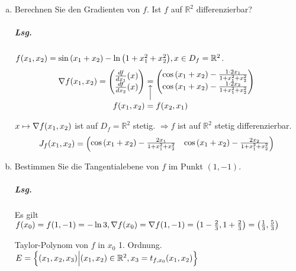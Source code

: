\documentclass{scrreprt}
\newcommand\skalprod[1]{\left\langle #1 \right\rangle}
\begin{document}
\newpage
\begin{enumerate}[a)]
\item Berechnen Sie den Gradienten von $f$.
  Ist $f$ auf $\mathbb{R}^2$ differenzierbar?

  \subparagraph{Lsg.}
  $f\qty(x_1, x_2) = \sin\qty(x_1 + x_2) - \ln\qty(1 + x_1^2 + x_2^2), x \in D_f = \mathbb{R}^2$.
  \[
    \nabla f\qty(x_1, x_2) = \begin{pmatrix}
      \frac{df}{dx_1}(x) \\
      \frac{df}{dx_2}(x)
    \end{pmatrix}
    \underset{\makebox[0pt]{$f\qty(x_1, x_2) = f\qty(x_2, x_1)$}}{\underset{\Big \uparrow}{=}}
    \begin{pmatrix}
      \cos\qty(x_1 + x_2) - \frac{1 \cdot 2 x_1}{1 + x_1^2 + x_2^2} \\
      \cos\qty(x_1 + x_2) - \frac{1 \cdot 2 x_2}{1 + x_1^2 + x_2^2}
    \end{pmatrix}
  \]

  $x \mapsto \nabla f\qty(x_1, x_2)$ ist auf $D_f = \mathbb{R}^2$ stetig.
  $\Rightarrow f$ ist auf $\mathbb{R}^2$ stetig differenzierbar.
  \[
    J_f\qty(x_1, x_2) = \begin{pmatrix}
      \cos\qty(x_1 + x_2) - \frac{2 x_1}{1 + x_1^2 + x_2^2} &
      \cos\qty(x_1 + x_2) - \frac{2 x_2}{1 + x_1^2 + x_2^2}
    \end{pmatrix}
  \]

\item Bestimmen Sie die Tangentialebene von $f$ im Punkt $(1, -1)$.
  \subparagraph{Lsg.}
  Es gilt $f\qty(x_0) = f(1, -1) = -\ln 3, \nabla f\qty(x_0) =
  \nabla f(1, -1) = \qty(1 - \frac{2}{3}, 1 + \frac{2}{3})
  = \qty(\frac{1}{3}, \frac{5}{3})$

  Taylor-Polynom von $f$ in $x_0$ 1. Ordnung.
  $E = \qty{(x_1, x_2, x_3) {\Big |} \qty(x_1, x_2) \in \mathbb{R}^2, x_3 = t_{f, x_0} \qty(x_1, x_2)}$


\end{enumerate}
\end{document}
